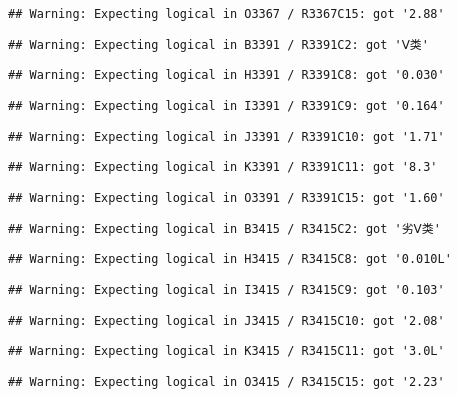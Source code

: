 \documentclass[
]{article}
\begin{document}
\begin{verbatim}
## Warning: Expecting logical in O3367 / R3367C15: got '2.88'
\end{verbatim}

\begin{verbatim}
## Warning: Expecting logical in B3391 / R3391C2: got 'Ⅴ类'
\end{verbatim}

\begin{verbatim}
## Warning: Expecting logical in H3391 / R3391C8: got '0.030'
\end{verbatim}

\begin{verbatim}
## Warning: Expecting logical in I3391 / R3391C9: got '0.164'
\end{verbatim}

\begin{verbatim}
## Warning: Expecting logical in J3391 / R3391C10: got '1.71'
\end{verbatim}

\begin{verbatim}
## Warning: Expecting logical in K3391 / R3391C11: got '8.3'
\end{verbatim}

\begin{verbatim}
## Warning: Expecting logical in O3391 / R3391C15: got '1.60'
\end{verbatim}

\begin{verbatim}
## Warning: Expecting logical in B3415 / R3415C2: got '劣Ⅴ类'
\end{verbatim}

\begin{verbatim}
## Warning: Expecting logical in H3415 / R3415C8: got '0.010L'
\end{verbatim}

\begin{verbatim}
## Warning: Expecting logical in I3415 / R3415C9: got '0.103'
\end{verbatim}

\begin{verbatim}
## Warning: Expecting logical in J3415 / R3415C10: got '2.08'
\end{verbatim}

\begin{verbatim}
## Warning: Expecting logical in K3415 / R3415C11: got '3.0L'
\end{verbatim}

\begin{verbatim}
## Warning: Expecting logical in O3415 / R3415C15: got '2.23'
\end{verbatim}
\end{document}
